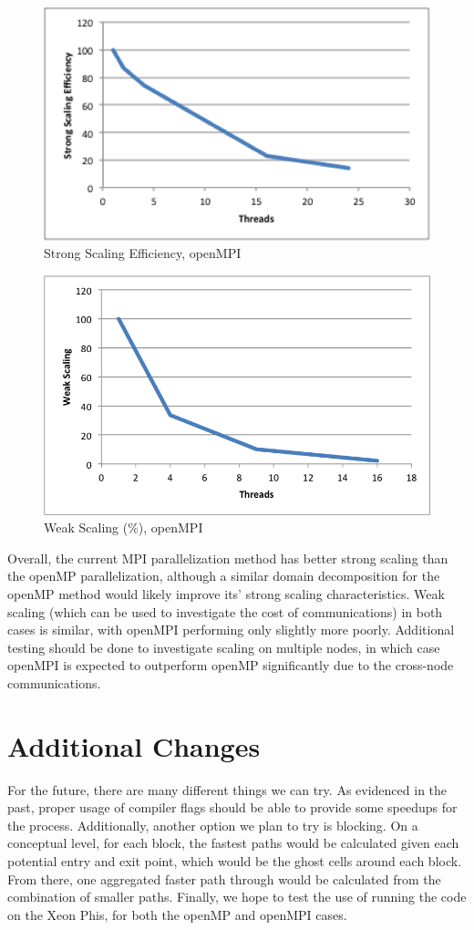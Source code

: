 \documentclass{article}
\begin{document}
	\begin{figure}[h!]
		\begin{center}
			\includegraphics[width=0.7\columnwidth]{st_graph_mpi}
			\caption{Strong Scaling Efficiency, openMPI}
			\label{st_mpi_g}
		\end{center}
	\end{figure}
	
	\begin{figure}[h!]
		\begin{center}
			\includegraphics[width=0.7\columnwidth]{wk_graph_mpi}
			\caption{Weak Scaling (\%), openMPI}
			\label{wk_mpi_g}
		\end{center}
	\end{figure}
	
Overall, the current MPI parallelization method has better strong scaling than the openMP parallelization, although a similar domain decomposition for the openMP method would likely improve its' strong scaling characteristics. Weak scaling (which can be used to investigate the cost of communications) in both cases is similar, with openMPI performing only slightly more poorly. Additional testing should be done to investigate scaling on multiple nodes, in which case openMPI is expected to outperform openMP significantly due to the cross-node communications.  
	

\section{Additional Changes}
For the future, there are many different things we can try. As evidenced in the past, proper usage of compiler flags should be able to provide some speedups for the process. Additionally, another option we plan to try is blocking. On a conceptual level, for each block, the fastest paths would be calculated given each potential entry and exit point, which would be the ghost cells around each block. From there, one aggregated faster path through would be calculated from the combination of smaller paths. Finally, we hope to test the use of running the code on the Xeon Phis, for both the openMP and openMPI cases.
\end{document}
